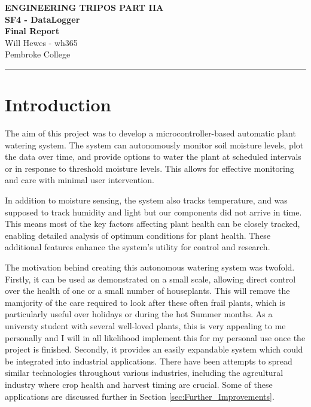 \documentclass[a4paper,11pt]{article}
\renewcommand{\maketitle}{
    \begin{center}
        \LARGE \textbf{ENGINEERING TRIPOS PART IIA} \\[0.5em]
        \Large \textbf{SF4 - DataLogger} \\[0.5em]
        \textbf{Final Report} \\[1.5em]
        \vspace{-1em}
        \small Will Hewes - wh365 \\ 
        Pembroke College \\ 
        \vspace{0.5em}
    \end{center}
}
\begin{document}

\maketitle
\hrule
\tableofcontents
\newpage
{} \setcounter{page}{1}

\section{Introduction}
\label{sec:Introduction}

The aim of this project was to develop a microcontroller-based 
automatic plant watering system.
The system can autonomously monitor soil moisture levels, 
plot the data over time, and provide options to water the plant
at scheduled intervals or in response to threshold moisture levels.
This allows for effective monitoring and care with minimal user intervention.

In addition to moisture sensing, the system also tracks temperature, 
and was supposed to track humidity and light 
but our components did not arrive in time.
This means most of the key factors affecting plant health
can be closely tracked, enabling detailed analysis of
optimum conditions for plant health.
These additional features enhance the system's utility
for control and research.

The motivation behind creating this autonomous watering system was twofold. 
Firstly, it can be used as demonstrated on a small scale,
allowing direct control over the health of one 
or a small number of houseplants. 
This will remove the mamjority of the care required
to look after these often frail plants,
which is particularly useful over holidays or 
during the hot Summer months.
As a universty student with several well-loved plants,
this is very appealing to me personally
and I will in all likelihood implement this 
for my personal use once the project is finished.
Secondly, it provides an easily expandable system
which could be integrated into industrial applications.
There have been attempts to spread similar technologies 
throughout various industries, 
including the agrcultural industry where crop health 
and harvest timing are crucial. 
Some of these applications are discussed further in
Section \ref{sec:Further_Improvements}.
\end{document}

